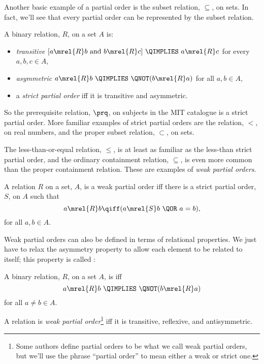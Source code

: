 Another basic example of a partial order is the subset relation,
$\subseteq$, on sets.  In fact, we'll see that every partial order can be
represented by the subset relation.

\begin{definition}
A binary relation, $R$, on a set $A$ is:
\begin{itemize}

\item \emph{transitive} \qiff 
$[a \mrel{R}  b \text{ and } b \mrel{R}  c]\ \QIMPLIES\  a \mrel{R}  c$
\quad for every $a,b,c\in A$,

\item \emph{asymmetric} \qiff
$a \mrel{R}  b\  \QIMPLIES\  \QNOT(b \mrel{R}  a)$
\quad for all $a,b\in A$,

\item a \emph{strict partial order} iff it is transitive and asymmetric.
\end{itemize}

\end{definition}

So the prerequisite relation, $\prq$, on subjects in the MIT catalogue is
a strict partial order.  More familiar examples of strict partial orders
are the relation, $<$, on real numbers, and the proper subset relation,
$\subset$, on sets.
\fi

The less-than-or-equal relation, $\leq$, is at least as familiar as
the less-than strict partial order, and the ordinary containment
relation, $\subseteq$, is even more common than the proper containment
relation.  These are examples of \emph{weak partial orders}.
\begin{definition}
A relation $R$ on a set, $A$, is a weak partial order iff
there is a strict partial order, $S$, on $A$ such that
\[
a \mrel{R} b \qiff (a \mrel{S} b\ \QOR\ a = b),
\]
for all $a,b \in A$.
\end{definition}
Weak partial orders can also be defined in terms of relational
properties.  We just have to relax the asymmetry property to allow
each element to be related to itself; this property is called
:

\begin{definition}\label{antis}
A binary relation, $R$, on a set $A$, is  iff
\[
a \mrel{R}  b\ \QIMPLIES\ \QNOT(b \mrel{R}  a)
\]
for all $a \neq b \in A$.

A relation is \emph{weak partial order}\footnote{Some authors define
  partial orders to be what we call weak partial orders, but we'll use
  the phrase ``partial order'' to mean either a weak or strict one.}
iff it is transitive, reflexive, and antisymmetric.
\end{definition}

